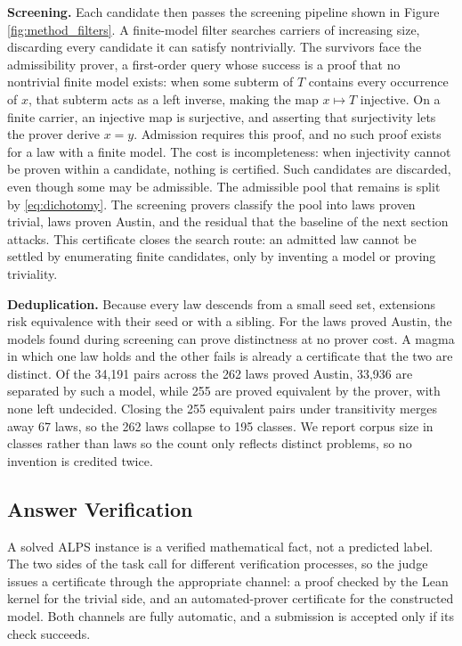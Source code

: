 \documentclass[letterpaper]{article} %
\begin{document}
\textbf{Screening.} Each candidate then passes the screening pipeline shown in Figure \ref{fig:method_filters}. A finite-model filter searches carriers of increasing size, discarding every candidate it can satisfy nontrivially. The survivors face the admissibility prover, a first-order query whose success is a proof that no nontrivial finite model exists: when some subterm of $T$ contains every occurrence of $x$, that subterm acts as a left inverse, making the map $x \mapsto T$ injective. On a finite carrier, an injective map is surjective, and asserting that surjectivity lets the prover derive $x = y$. Admission requires this proof, and no such proof exists for a law with a finite model. The cost is incompleteness: when injectivity cannot be proven within a candidate, nothing is certified. Such candidates are discarded, even though some may be admissible. The admissible pool that remains is split by \eqref{eq:dichotomy}. The screening provers classify the pool into laws proven trivial, laws proven Austin, and the residual that the baseline of the next section attacks. This certificate closes the search route: an admitted law cannot be settled by enumerating finite candidates, only by inventing a model or proving triviality.

\textbf{Deduplication.} Because every law descends from a small seed set, extensions risk equivalence with their seed or with a sibling. For the laws proved Austin, the models found during screening can prove distinctness at no prover cost. A magma in which one law holds and the other fails is already a certificate that the two are distinct. Of the 34,191 pairs across the 262 laws proved Austin, 33,936 are separated by such a model, while 255 are proved equivalent by the prover, with none left undecided. Closing the 255 equivalent pairs under transitivity merges away 67 laws, so the 262 laws collapse to 195 classes. We report corpus size in classes rather than laws so the count only reflects distinct problems, so no invention is credited twice. 

\subsection{Answer Verification}

A solved ALPS instance is a verified mathematical fact, not a predicted label. The two sides of the task call for different verification processes, so the judge issues a certificate through the appropriate channel: a proof checked by the Lean kernel for the trivial side, and an automated-prover certificate for the constructed model. Both channels are fully automatic, and a submission is accepted only if its check succeeds. 
\end{document}
